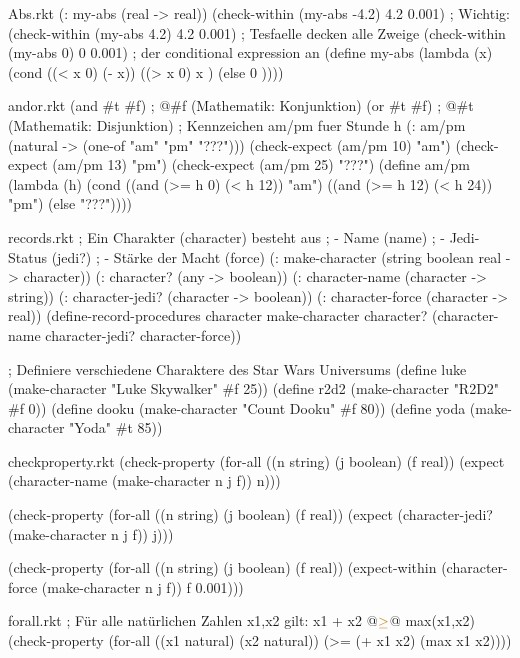 \begin{filecontents*}{Abs.rkt}
(: my-abs (real -> real))
(check-within (my-abs -4.2) 4.2 0.001)   ; Wichtig:
(check-within (my-abs 4.2) 4.2 0.001)    ; Tesfaelle decken alle Zweige
(check-within (my-abs 0) 0 0.001)        ; der conditional expression an
(define my-abs
  (lambda (x)
    (cond ((< x 0) (- x))
          ((> x 0) x    )
          (else    0    ))))
\end{filecontents*}
\begin{filecontents*}{andor.rkt}
(and #t #f)  ; @\eval@ #f   (Mathematik: Konjunktion)
(or #t #f)   ; @\eval@ #t   (Mathematik: Disjunktion)
; Kennzeichen am/pm fuer Stunde h
(: am/pm (natural -> (one-of "am" "pm" "???")))
(check-expect (am/pm 10) "am")
(check-expect (am/pm 13) "pm")
(check-expect (am/pm 25) "???")
(define am/pm
  (lambda (h)
    (cond ((and (>= h 0) (< h 12))  "am")
          ((and (>= h 12) (< h 24)) "pm")
          (else "???"))))
\end{filecontents*}
\begin{filecontents*}{records.rkt}
; Ein Charakter (character) besteht aus
; - Name (name)
; - Jedi-Status (jedi?)
; - Stärke der Macht (force)
(: make-character (string boolean real -> character))
(: character? (any -> boolean))
(: character-name (character -> string))
(: character-jedi? (character -> boolean))
(: character-force (character -> real))
(define-record-procedures character
  make-character
  character?
  (character-name
   character-jedi?
   character-force))


; Definiere verschiedene Charaktere des Star Wars Universums
(define luke
  (make-character "Luke Skywalker" #f 25))
(define r2d2
  (make-character "R2D2" #f 0))
(define dooku
  (make-character "Count Dooku" #f 80))
(define yoda
  (make-character "Yoda" #t 85))
\end{filecontents*}
\begin{filecontents*}{checkproperty.rkt}
(check-property 
 (for-all ((n string)
           (j boolean)
           (f real))
   (expect (character-name (make-character n j f)) n)))

(check-property 
 (for-all ((n string)
           (j boolean)
           (f real))
   (expect (character-jedi? (make-character n j f)) j)))

(check-property 
 (for-all ((n string)
           (j boolean)
           (f real))
   (expect-within (character-force (make-character n j f)) f 0.001)))
\end{filecontents*}
\begin{filecontents*}{forall.rkt}
; Für alle natürlichen Zahlen x1,x2 gilt: x1 + x2 @$\textcolor{kommentar}{\geq}$@ max(x1,x2)
(check-property
 (for-all ((x1 natural)
           (x2 natural))
   (>= (+ x1 x2) (max x1 x2))))
\end{filecontents*}
